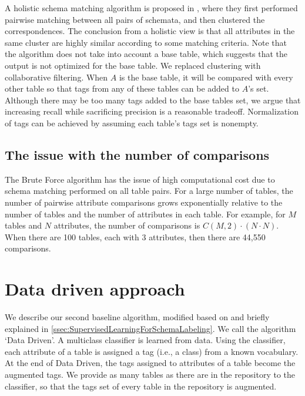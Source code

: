 A holistic schema matching algorithm is proposed in \cite{Rahm2016Case}, where they first performed pairwise matching between all pairs of schemata, and then clustered the correspondences. The conclusion from a holistic view is that all attributes in the same cluster are highly similar according to some matching criteria. Note that the algorithm does not take into account a base table, which suggests that the output is not optimized for the base table. We replaced clustering with collaborative filtering. When $A$ is the base table, it will be compared with every other table so that tags from any of these tables can be added to $A$'s set. Although there may be too many tags added to the base tables set, we argue that increasing recall while sacrificing precision is a reasonable tradeoff. Normalization of tags can be achieved by assuming each table's tags set is nonempty.

\subsection{The issue with the number of comparisons}

The Brute Force algorithm has the issue of high computational cost due to schema matching performed on all table pairs. For a large number of tables, the number of pairwise attribute comparisons grows exponentially relative to the number of tables and the number of attributes in each table. For example, for $M$ tables and $N$ attributes, the number of comparisons is $C(M,2)\cdot(N\cdot N)$. When there are 100 tables, each with 3 attributes, then there are 44,550 comparisons.

\section{Data driven approach}
\label{sec:DataDrivenApproach}

We describe our second baseline algorithm, modified based on \cite{10.1145/3184558.3191601} and briefly explained in \autoref{ssec:SupervisedLearningForSchemaLabeling}. We call the algorithm `Data Driven'. A multiclass classifier is learned from data. Using the classifier, each attribute of a table is assigned a tag (i.e., a class) from a known vocabulary. At the end of Data Driven, the tags assigned to attributes of a table become the augmented tags. We provide as many tables as there are in the repository to the classifier, so that the tags set of every table in the repository is augmented.

